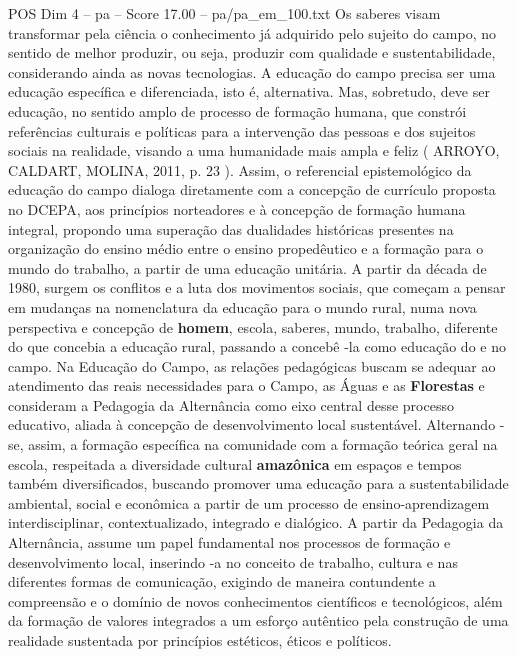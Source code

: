 \begin{textsample}{POS Dim 4 – pa – Score 17.00 – pa/pa\_em\_100.txt}
Os saberes visam transformar pela ciência o conhecimento já adquirido pelo sujeito do campo, no sentido de melhor produzir, ou seja, produzir com qualidade e sustentabilidade, considerando ainda as novas tecnologias.
A educação do campo precisa ser uma educação específica e diferenciada, isto é, alternativa.
Mas, sobretudo, deve ser educação, no sentido amplo de processo de formação humana, que constrói referências culturais e políticas para a intervenção das pessoas e dos sujeitos sociais na realidade, visando a uma humanidade mais ampla e feliz ( ARROYO, CALDART, MOLINA, 2011, p. 23 ).
Assim, o referencial epistemológico da educação do campo dialoga diretamente com a concepção de currículo proposta no DCEPA, aos princípios norteadores e à concepção de formação humana integral, propondo uma superação das dualidades históricas presentes na organização do ensino médio entre o ensino propedêutico e a formação para o mundo do trabalho, a partir de uma educação unitária.
A partir da década de 1980, surgem os conflitos e a luta dos movimentos sociais, que começam a pensar em mudanças na nomenclatura da educação para o mundo rural, numa nova perspectiva e concepção de \textbf{homem}, escola, saberes, mundo, trabalho, diferente do que concebia a educação rural, passando a concebê -la como educação do e no campo.
Na Educação do Campo, as relações pedagógicas buscam se adequar ao atendimento das reais necessidades para o Campo, as Águas e as \textbf{Florestas} e consideram a Pedagogia da Alternância como eixo central desse processo educativo, aliada à concepção de desenvolvimento local sustentável.
Alternando -se, assim, a formação específica na comunidade com a formação teórica geral na escola, respeitada a diversidade cultural \textbf{amazônica} em espaços e tempos também diversificados, buscando promover uma educação para a sustentabilidade ambiental, social e econômica a partir de um processo de ensino-aprendizagem interdisciplinar, contextualizado, integrado e dialógico.
A partir da Pedagogia da Alternância, assume um papel fundamental nos processos de formação e desenvolvimento local, inserindo -a no conceito de trabalho, cultura e nas diferentes formas de comunicação, exigindo de maneira contundente a compreensão e o domínio de novos conhecimentos científicos e tecnológicos, além da formação de valores integrados a um esforço autêntico pela construção de uma realidade sustentada por princípios estéticos, éticos e políticos.

\end{textsample}
